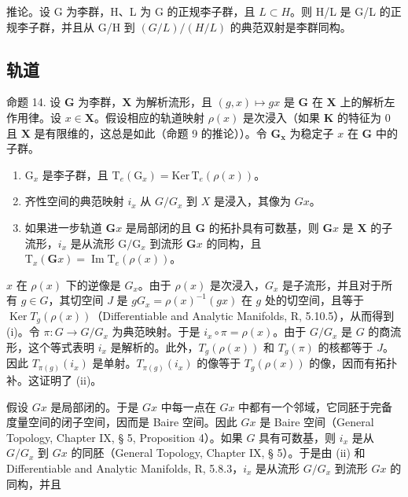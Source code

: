 推论。设 G 为李群，H、L 为 G 的正规李子群，且 \(L \subset H\)。则 H/L 是 G/L 的正规李子群，并且从 G/H 到 \((G/L)/(H/L)\) 的典范双射是李群同构。

\subsection{轨道}

命题 14. 设 \(\mathbf{G}\) 为李群，\(\mathbf{X}\) 为解析流形，且 \((g,x)\mapsto gx\) 是 \(\mathbf{G}\) 在 \(\mathbf{X}\) 上的解析左作用律。设 \(x\in \mathbf{X}\)。假设相应的轨道映射 \(\rho (x)\) 是次浸入（如果 \(\mathbf{K}\) 的特征为 0 且 \(\mathbf{X}\) 是有限维的，这总是如此（命题 9 的推论））。令 \(\mathbf{G}_{\mathbf{x}}\) 为稳定子 \(x\) 在 \(\mathbf{G}\) 中的子群。

\begin{enumerate}
\def\labelenumi{(\roman{enumi})}
\item
  \(\mathrm{G}_x\) 是李子群，且 \(\mathrm{T}_e(\mathrm{G}_x) = \mathrm{Ker}\, \mathrm{T}_e(\rho(x))\)。
\item
  齐性空间的典范映射 \(i_x\) 从 \(G / G_x\) 到 \(X\) 是浸入，其像为 \(Gx\)。
\item
  如果进一步轨道 \(\mathbf{G}x\) 是局部闭的且 \(\mathbf{G}\) 的拓扑具有可数基，则 \(\mathbf{G}x\) 是 \(\mathbf{X}\) 的子流形，\(i_x\) 是从流形 \(\mathrm{G} / \mathrm{G}_x\) 到流形 \(\mathbf{G}x\) 的同构，且 \(\mathrm{T}_x(\mathbf{G}x) = \operatorname{Im} \mathrm{T}_e(\rho(x))\)。
\end{enumerate}

\(x\) 在 \(\rho(x)\) 下的逆像是 \(G_x\)。由于 \(\rho(x)\) 是次浸入，\(G_x\) 是子流形，并且对于所有 \(g \in G\)，其切空间 \(J\) 是 \(gG_x = \rho(x)^{-1}(gx)\) 在 \(g\) 处的切空间，且等于 \(\operatorname{Ker} T_g(\rho(x))\)（Differentiable and Analytic Manifolds, R, 5.10.5），从而得到 (i)。令 \(\pi: G \to G/G_x\) 为典范映射。于是 \(i_x \circ \pi = \rho(x)\)。由于 \(G/G_x\) 是 \(G\) 的商流形，这个等式表明 \(i_x\) 是解析的。此外，\(T_g(\rho(x))\) 和 \(T_g(\pi)\) 的核都等于 \(J\)。因此 \(T_{\pi(g)}(i_x)\) 是单射。\(T_{\pi(g)}(i_x)\) 的像等于 \(T_g(\rho(x))\) 的像，因而有拓扑补。这证明了 (ii)。

假设 \(Gx\) 是局部闭的。于是 \(Gx\) 中每一点在 \(Gx\) 中都有一个邻域，它同胚于完备度量空间的闭子空间，因而是 Baire 空间。因此 \(Gx\) 是 Baire 空间（General Topology, Chapter IX, § 5, Proposition 4）。如果 \(G\) 具有可数基，则 \(i_x\) 是从 \(G / G_x\) 到 \(Gx\) 的同胚（General Topology, Chapter IX, § 5）。于是由 (ii) 和 Differentiable and Analytic Manifolds, R, 5.8.3，\(i_x\) 是从流形 \(G / G_x\) 到流形 \(Gx\) 的同构，并且

